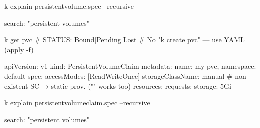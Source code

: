 \begin{tcbitemize}[
  raster columns=2, raster equal height=rows,
  blanker, cheat subtitle
]
\begin{tcbitemize}[
      raster columns=1, raster equal height=rows,
      blanker, cheat subtitle
    ]
        \begin{cheatcodebash}
        k explain persistentvolume.spec --recursive
        \end{cheatcodebash}
        \begin{cheatcodebash}
        search: "persistent volumes"
        \end{cheatcodebash}

    \end{tcbitemize}

  \tcbitem
    \begin{tcbitemize}[
      raster columns=1, raster equal height=rows,
      blanker, cheat subtitle
    ]
      \tcbitem


        \begin{cheatcodebashbold}
        k get pvc    # STATUS: Bound|Pending|Lost
        # No "k create pvc" — use YAML (apply -f)
        \end{cheatcodebashbold}

        \begin{cheatcodebash}
        apiVersion: v1
        kind: PersistentVolumeClaim
        metadata: {name: my-pvc, namespace: default}
        spec:
          accessModes: [ReadWriteOnce]
          storageClassName: manual  # non-existent SC → static prov. ("" works too)
          resources:
            requests: {storage: 5Gi}
        \end{cheatcodebash}

        \begin{cheatcodebash}
        k explain persistentvolumeclaim.spec --recursive
        \end{cheatcodebash}
        \begin{cheatcodebash}
        search: "persistent volumes"
        \end{cheatcodebash}

      \tcbitem


\end{tcbitemize}
\end{tcbitemize}
